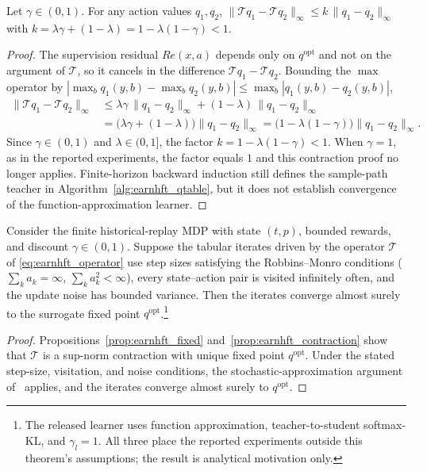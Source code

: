 \begin{proposition}
\label{prop:earnhft_contraction}
Let $\gamma\in(0,1)$. For any action values $q_1,q_2$, $\|\mathcal{T}q_1-\mathcal{T}q_2\|_\infty \le k\,\|q_1-q_2\|_\infty$ with $k=\lambda\gamma+(1-\lambda)=1-\lambda(1-\gamma)<1$.
\end{proposition}
\begin{proof}
The supervision residual $Re(x,a)$ depends only on $q^{\mathrm{opt}}$ and not on the argument of $\mathcal{T}$, so it cancels in the difference $\mathcal{T}q_1-\mathcal{T}q_2$. Bounding the $\max$ operator by $|\max_b q_1(y,b)-\max_b q_2(y,b)|\le\max_b|q_1(y,b)-q_2(y,b)|$,
\begin{align*}
\|\mathcal{T}q_1-\mathcal{T}q_2\|_\infty
&\le \lambda\gamma\,\|q_1-q_2\|_\infty + (1-\lambda)\,\|q_1-q_2\|_\infty \\
&= \bigl(\lambda\gamma+(1-\lambda)\bigr)\|q_1-q_2\|_\infty = \bigl(1-\lambda(1-\gamma)\bigr)\|q_1-q_2\|_\infty.
\end{align*}
Since $\gamma\in(0,1)$ and $\lambda\in(0,1]$, the factor $k=1-\lambda(1-\gamma)<1$. When $\gamma=1$, as in the reported experiments, the factor equals $1$ and this contraction proof no longer applies. Finite-horizon backward induction still defines the sample-path teacher in Algorithm~\ref{alg:earnhft_qtable}, but it does not establish convergence of the function-approximation learner.
\end{proof}

\begin{theorem}
\label{thm:earnhft_convergence}
Consider the finite historical-replay MDP with state $(t,p)$, bounded rewards, and discount $\gamma\in(0,1)$. Suppose the tabular iterates driven by the operator $\mathcal{T}$ of \eqref{eq:earnhft_operator} use step sizes satisfying the Robbins--Monro conditions ($\sum_k a_k=\infty$, $\sum_k a_k^2<\infty$), every state--action pair is visited infinitely often, and the update noise has bounded variance. Then the iterates converge almost surely to the surrogate fixed point $q^{\mathrm{opt}}$.\footnote{The released learner uses function approximation, teacher-to-student softmax-KL, and $\gamma_l=1$. All three place the reported experiments outside this theorem's assumptions; the result is analytical motivation only.}
\end{theorem}
\begin{proof}
Propositions~\ref{prop:earnhft_fixed} and~\ref{prop:earnhft_contraction} show that $\mathcal{T}$ is a sup-norm contraction with unique fixed point $q^{\mathrm{opt}}$. Under the stated step-size, visitation, and noise conditions, the stochastic-approximation argument of~\cite{jaakkola1993convergence} applies, and the iterates converge almost surely to $q^{\mathrm{opt}}$.
\end{proof}

